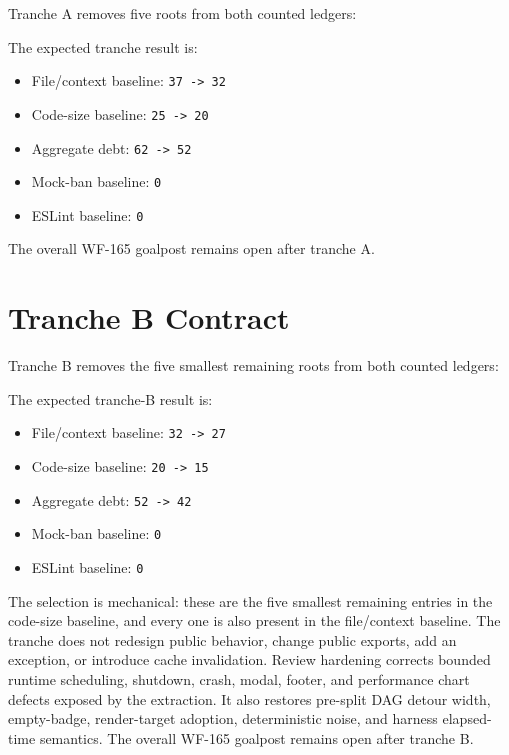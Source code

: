 Tranche A removes five roots from both counted ledgers:



The expected tranche result is:

\begin{itemize}
\tightlist
\item
  File/context baseline: \texttt{3\allowbreak{}7\allowbreak{} \allowbreak{}-\allowbreak{}>\allowbreak{} \allowbreak{}3\allowbreak{}2}
\item
  Code-size baseline: \texttt{2\allowbreak{}5\allowbreak{} \allowbreak{}-\allowbreak{}>\allowbreak{} \allowbreak{}2\allowbreak{}0}
\item
  Aggregate debt: \texttt{6\allowbreak{}2\allowbreak{} \allowbreak{}-\allowbreak{}>\allowbreak{} \allowbreak{}5\allowbreak{}2}
\item
  Mock-ban baseline: \texttt{0}
\item
  ESLint baseline: \texttt{0}
\end{itemize}

The overall WF-165 goalpost remains open after tranche A.

\section{Tranche B Contract}\label{record-247-tranche-b-contract}

Tranche B removes the five smallest remaining roots from both counted ledgers:



The expected tranche-B result is:

\begin{itemize}
\tightlist
\item
  File/context baseline: \texttt{3\allowbreak{}2\allowbreak{} \allowbreak{}-\allowbreak{}>\allowbreak{} \allowbreak{}2\allowbreak{}7}
\item
  Code-size baseline: \texttt{2\allowbreak{}0\allowbreak{} \allowbreak{}-\allowbreak{}>\allowbreak{} \allowbreak{}1\allowbreak{}5}
\item
  Aggregate debt: \texttt{5\allowbreak{}2\allowbreak{} \allowbreak{}-\allowbreak{}>\allowbreak{} \allowbreak{}4\allowbreak{}2}
\item
  Mock-ban baseline: \texttt{0}
\item
  ESLint baseline: \texttt{0}
\end{itemize}

The selection is mechanical: these are the five smallest remaining entries in the code-size baseline, and every one is also present in the file/context baseline. The tranche does not redesign public behavior, change public exports, add an exception, or introduce cache invalidation. Review hardening corrects bounded runtime scheduling, shutdown, crash, modal, footer, and performance chart defects exposed by the extraction. It also restores pre-split DAG detour width, empty-badge, render-target adoption, deterministic noise, and harness elapsed-time semantics. The overall WF-165 goalpost remains open after tranche B.


